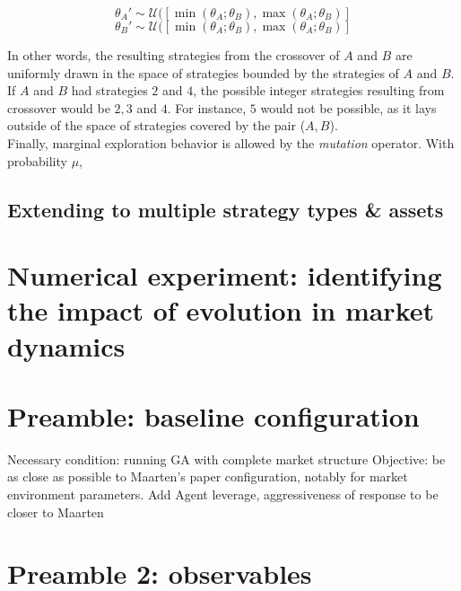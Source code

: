 \documentclass{article}
\begin{document}
\begin{equation}
    \theta_A' \sim \mathcal{U}([\min(\theta_A; \theta_B), \max(\theta_A; \theta_B)] 
\end{equation}
\begin{equation}
    \theta_B' \sim \mathcal{U}([\min(\theta_A; \theta_B), \max(\theta_A; \theta_B)] 
\end{equation}

In other words, the resulting strategies from the crossover of $A$ and $B$ are uniformly drawn in the space of strategies bounded by the strategies of $A$ and $B$. If $A$ and $B$ had strategies $2$ and $4$, the possible integer strategies resulting from crossover would be $2, 3$ and $4$. For instance, $5$ would not be possible, as it lays outside of the space of strategies covered by the pair ($A,B$).\\

Finally, marginal exploration behavior is allowed by the \textit{mutation} operator. With probability $\mu$, 



\subsection{Extending to multiple strategy types \& assets}

\section{Numerical experiment: identifying the impact of evolution in market dynamics}



\section{Preamble: baseline configuration}

Necessary condition: running GA with complete market structure
Objective: be as close as possible to Maarten's paper configuration, notably for market environment parameters.
Add Agent leverage, aggressiveness of response to be closer to Maarten
\section{Preamble 2: observables}
\end{document}
